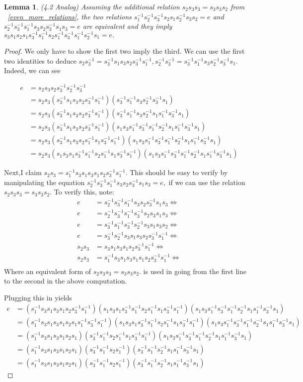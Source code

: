 \documentclass[11pt]{amsart}
\newtheorem{lem}[thm]{Lemma}
\theoremstyle{definition}
\newcommand\tri{s_3^{-1}}
\newcommand\tr{s_3}
\newcommand\twi{s_2^{-1}}
\newcommand\tw{s_2}
\newcommand\oni{s_1^{-1}}
\newcommand\on{s_1}
\begin{document}
\begin{lem} 
\label{4.2_analog}
(4.2 Analog)
Assuming the additional relation $\tw\tr\tr = \tr\tr\tw$ from ~\ref{even_more_relations}, the two relations $s_{1}^{-1}s_2^{-1}s_3^{-1}s_2s_1s_2^{-1}s_3s_2 = e$ and $\twi\tri\oni\tr\tw\tri\on\tr =e$ are equivalent and they imply $\tr\on\tw\on\tri\oni\tw\oni\tri\oni\twi\on=e. $
\end{lem}
\begin{proof}


We only have to show the first two imply the third. We can use the first two identities to deduce $\tw\tri = \tri\on\tr\tw\tri\oni,\twi\tri=\tri\oni\tr\twi\tri\on.$ Indeed, we can see

\begin{align*}
	e &= \tw\tr\tw\tri\twi\tri
	\\
	&= \tw\tr(\tri\on\tr\tw\tri\oni)(\tri\oni\tr\twi\tri\on)
	\\
	&= \tw\tr(\tri\on\tr\tw\tri\oni)(\tri\oni\tr\twi\on\oni\tri\on)
	\\
	&= \tw\tr(\tri\on\tr\tw\tri\oni)(\on\tr\oni\tri\oni\twi\on\oni\tri\on)
	\\
	&= \tw\tr(\tri\on\tr\tw\oni\on\tri\oni)(\on\tr\oni\tri\oni\twi\on\oni\tri\on)
	\\
	&= \tw\tr(\on\tr\on\tri\oni\tw\oni\on\tri\oni)(\on\tr\oni\tri\oni\twi\on\oni\tri\on)
\end{align*}

Next,I claim $\tw\tr = \oni\tr\on\tr\on\tw\tri\oni.$ This should be easy to verify by manipulating the equation $\twi\tri\oni\tr\tw\tri\on\tr =e,$ if we can use the relation $\tw\tr\tr = \tr\tr\tw.$
To verify this, note:
\begin{align*}
	e &= \twi\tri\oni\tr\tw\tri\on\tr \iff \\
	e &= \twi\tri\oni\tri\tw\tr\on\tr \iff \\
	e &= \tri\oni\tri\twi\tr\on\tr\tw \iff \\
	e &= \tri\twi\tr\on\tr\tw\tri\oni \iff \\
	\tw\tr &= \tr\on\tr\on\tw\tri\oni \iff \\
	 \tw\tr &= \oni\tr\on\tr\on\on\tw\tri\oni \iff \\
\end{align*} 
Where an equivalent form of $\tw\tr\tr = \tr\tr\tw.$ is used in going from the first line to the second in the above computation.

 Plugging this in yields
\begin{align*}
	e &= (\oni\tr\on\tr\on\tw\tri\oni)(\on\tr\on\tri\oni\tw\oni\on\tri\oni)(\on\tr\oni\tri\oni\twi\on\oni\tri\on)
	\\
	&= (\oni\tr\on\tr\on\tw\on\oni\tri\oni)(\on\tr\on\tri\oni\tw\oni\on\tri\oni)(\on\tr\oni\tri\oni\twi\on\oni\tri\on)
	\\
	&= (\oni\tr\on\tr\on\tw\on)(\tri\oni\tw\oni\on\tri\oni)(\on\tr\oni\tri\oni\twi\on\oni\tri\on)
	\\
	&= (\oni\tr\on\tr\on\tw\on)(\tri\oni\tw\oni)(\tri\oni\twi\on\oni\tri\on)
	\\
	&= (\oni\tr\on\tr\on\tw\on)(\tri\oni\tw\oni)(\tri\oni\twi\on\oni\tri\on)
\end{align*}


\end{proof}
\end{document}
